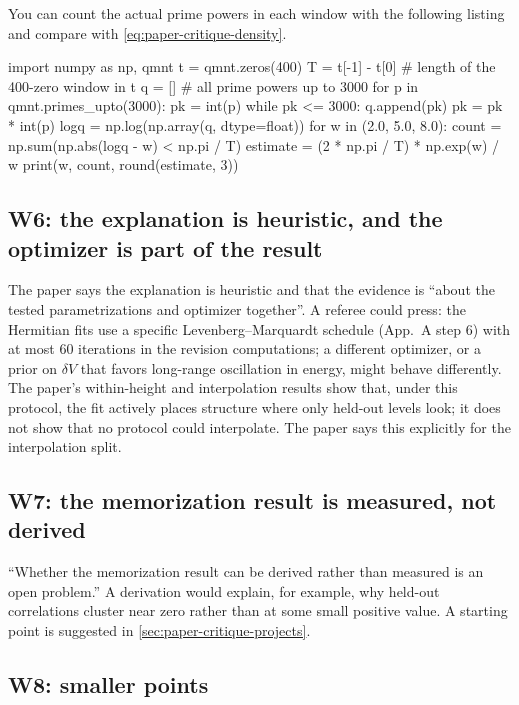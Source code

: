 You can count the actual prime powers in each window with the following listing and compare with \eqref{eq:paper-critique-density}.

\begin{pycode}
import numpy as np, qmnt
t = qmnt.zeros(400)
T = t[-1] - t[0]                 # length of the 400-zero window in t
q = []                           # all prime powers up to 3000
for p in qmnt.primes_upto(3000):
    pk = int(p)
    while pk <= 3000:
        q.append(pk)
        pk = pk * int(p)
logq = np.log(np.array(q, dtype=float))
for w in (2.0, 5.0, 8.0):
    count = np.sum(np.abs(logq - w) < np.pi / T)
    estimate = (2 * np.pi / T) * np.exp(w) / w
    print(w, count, round(estimate, 3))
\end{pycode}

\subsection{W6: the explanation is heuristic, and the optimizer is part of the result}

The paper says the explanation is heuristic and that the evidence is ``about the tested parametrizations and optimizer together''. A referee could press: the Hermitian fits use a specific Levenberg--Marquardt schedule (App.~A step 6) with at most 60 iterations in the revision computations; a different optimizer, or a prior on $\delta V$ that favors long-range oscillation in energy, might behave differently. The paper's within-height and interpolation results show that, under this protocol, the fit actively places structure where only held-out levels look; it does not show that no protocol could interpolate. The paper says this explicitly for the interpolation split.

\subsection{W7: the memorization result is measured, not derived}

``Whether the memorization result can be derived rather than measured is an open problem.'' A derivation would explain, for example, why held-out correlations cluster near zero rather than at some small positive value. A starting point is suggested in \cref{sec:paper-critique-projects}.

\subsection{W8: smaller points}

